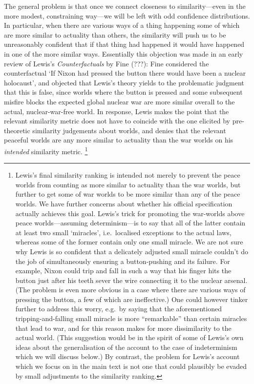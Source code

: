 \documentclass[leqno, 11pt, a5paper, openany]{article}
\begin{document}
The general problem is that once we connect closeness to similarity---even in the more modest, constraining way---we will be left with odd confidence distributions. In particular, when there are various ways of a thing happening some of which are more similar to actuality than others, the similarity will push us to be unreasonably confident that if that thing had happened it would have happened in one of the more similar ways. Essentially this objection was made in an early review of Lewis's \emph{Counterfactuals} by Fine (???): Fine considered the counterfactual ‘If Nixon had pressed the button there would have been a nuclear holocaust’, and objected that Lewis's theory yields to the problematic judgment that this is false, since worlds where the button is pressed and some subsequent misfire blocks the expected global nuclear war are more similar overall to the actual, nuclear-war-free world. In response, Lewis makes the point that the relevant similarity metric does not have to coincide with the one elicited by pre-theoretic similarity judgements about worlds, and denies that the relevant peaceful worlds are any more similar to actuality than the war worlds on his \emph{intended} similarity metric.%
\footnote{Lewis's final similarity ranking is intended not merely to prevent the peace worlds from counting as more similar to actuality than the war worlds, but further to get some of war worlds to be more similar than any of the peace worlds. We have further concerns about whether his official specification actually achieves this goal. Lewis's trick for promoting the war-worlds above peace worlds---assuming determinism---is to say that all of the latter contain at least two small ‘miracles’, i.e.~localised exceptions to the actual laws, whereas some of the former contain only one small miracle. We are not sure why Lewis is so confident that a delicately adjusted small miracle couldn't do the job of simultaneously ensuring a button-pushing and its failure. For example, Nixon could trip and fall in such a way that his finger hits the button just after his teeth sever the wire connecting it to the nuclear arsenal. (The problem is even more obvious in a case where there are various ways of pressing the button, a few of which are ineffective.) One could however tinker further to address this worry, e.g.~by saying that the aforementioned tripping-and-falling small miracle is more “remarkable” than certain miracles that lead to war, and for this reason makes for more dissimilarity to the actual world. (This suggestion would be in the spirit of some of Lewis's own ideas about the generalisation of the account to the case of indeterminism which we will discuss below.) By contrast, the problem for Lewis's account which we focus on in the main text is not one that could plausibly be evaded by small adjustments to the similarity ranking.} 
\end{document}
